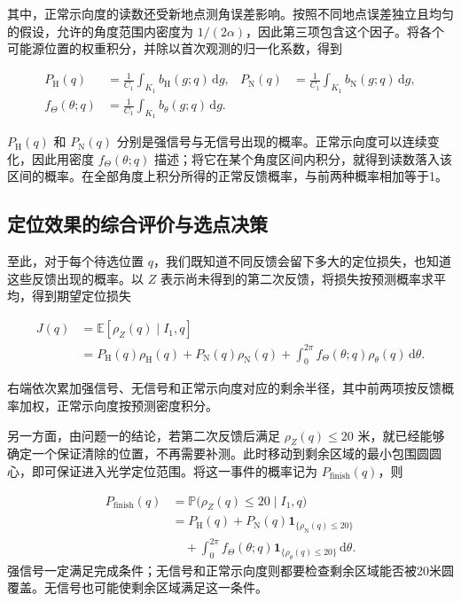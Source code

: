 \documentclass[UTF8,a4paper,zihao=-4,fontset=none]{ctexart}
\begin{document}
其中，正常示向度的读数还受新地点测角误差影响。按照不同地点误差独立且均匀的假设，允许的角度范围内密度为 \(1/(2\alpha)\)，因此第三项包含这个因子。将各个可能源位置的权重积分，并除以首次观测的归一化系数，得到

\begin{equation}
\begin{aligned}
 P_{\mathrm H}(q)&=\frac{1}{C_1}\int_{K_1}b_{\mathrm H}(g;q)\,\mathrm dg,
 &P_{\mathrm N}(q)&=\frac{1}{C_1}\int_{K_1}b_{\mathrm N}(g;q)\,\mathrm dg,\\
 f_\Theta(\theta;q)&=\frac{1}{C_1}\int_{K_1}b_\theta(g;q)\,\mathrm dg.
\end{aligned}
\label{eq:q2-pair-prediction}
\end{equation}

\(P_{\mathrm H}(q)\) 和 \(P_{\mathrm N}(q)\) 分别是强信号与无信号出现的概率。正常示向度可以连续变化，因此用密度 \(f_\Theta(\theta;q)\) 描述；将它在某个角度区间内积分，就得到读数落入该区间的概率。在全部角度上积分所得的正常反馈概率，与前两种概率相加等于1。

\subsection{定位效果的综合评价与选点决策}

至此，对于每个待选位置 \(q\)，我们既知道不同反馈会留下多大的定位损失，也知道这些反馈出现的概率。以 \(Z\) 表示尚未得到的第二次反馈，将损失按预测概率求平均，得到期望定位损失

\begin{equation}
\begin{aligned}
 J(q)&=\mathbb E[\rho_Z(q)\mid I_1,q]\\
 &=P_{\mathrm H}(q)\rho_{\mathrm H}(q)+P_{\mathrm N}(q)\rho_{\mathrm N}(q)
 +\int_0^{2\pi}f_\Theta(\theta;q)\rho_\theta(q)\,\mathrm d\theta.
\end{aligned}
\label{eq:q2-pair-expected-objective}
\end{equation}

右端依次累加强信号、无信号和正常示向度对应的剩余半径，其中前两项按反馈概率加权，正常示向度按预测密度积分。

另一方面，由问题一的结论，若第二次反馈后满足 \(\rho_Z(q)\le20\) 米，就已经能够确定一个保证清除的位置，不再需要补测。此时移动到剩余区域的最小包围圆圆心，即可保证进入光学定位范围。将这一事件的概率记为 \(P_{\mathrm{finish}}(q)\)，则

\begin{equation}
\begin{aligned}
 P_{\mathrm{finish}}(q)
 &=\mathbb{P}\bigl(\rho_Z(q)\le20\mid I_1,q\bigr)\\
 &=P_{\mathrm H}(q)+P_{\mathrm N}(q)\mathbf1_{\{\rho_{\mathrm N}(q)\le20\}}\\
 &\quad+\int_0^{2\pi}f_\Theta(\theta;q)\mathbf1_{\{\rho_\theta(q)\le20\}}\,\mathrm d\theta.
\end{aligned}
\label{eq:q2-completion-probability}
\end{equation}
强信号一定满足完成条件；无信号和正常示向度则都要检查剩余区域能否被20米圆覆盖。无信号也可能使剩余区域满足这一条件。
\end{document}

